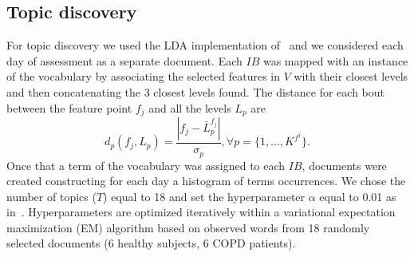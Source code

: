 \subsection{Topic discovery}
For topic discovery we used the LDA implementation of~\cite{Blei_2003} and we considered each day of assessment as a separate document.
%
%
Each $IB$ was mapped with an instance of the vocabulary by associating the selected features in $V$ with their closest levels and then concatenating the 3 closest levels found. 
%
The distance for each bout between the feature point $f_{j}$  and all the levels $L_{p}$ are
\begin{equation}\label{eq:distance}
d_{p}({f_{j},L_{p}}) = \frac{\left|f_{j}-\bar{L}^{f_{j}}_{p}\right|}{\sigma_{p}} , \forall p=\{1,...,K^{f^{j}}\}.
\end{equation}
Once that a term of the vocabulary was assigned to each $IB$, documents were created constructing for each day a histogram of terms occurrences. 
We chose the number of topics ($T$) equal to 18 and set the hyperparameter $\alpha$ equal to 0.01 as in~\cite{Huynh_2008}. Hyperparameters are optimized iteratively
within a variational expectation maximization (EM) algorithm based on observed words from 18 randomly selected documents (6 healthy subjects, 6 COPD patients).

